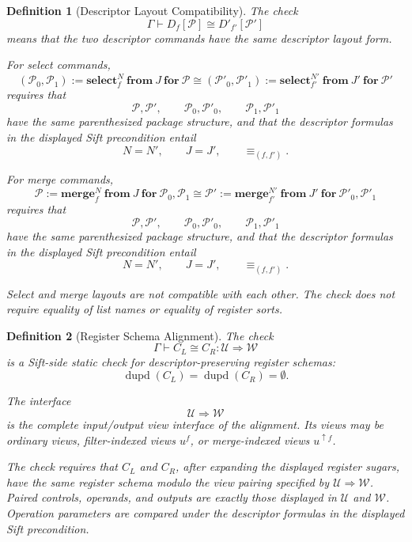 \documentclass[acmsmall,screen,review,anonymous,nonacm]{acmart}
\newtheorem{definition}{Definition}[section]
\theoremstyle{defn_style}
\begin{document}
\begin{definition}[Descriptor Layout Compatibility]
  The check
  \[
  \Gamma
  \vdash
  D_f[\mathcal P]
  \cong
  D'_{f'}[\mathcal P']
  \]
  means that the two descriptor commands have the same descriptor layout form.
  
  For select commands,
  \[
  (\mathcal P_0,\mathcal P_1)
  :=
  \mathbf{select}_{f}^{N}\ \mathbf{from}\ J\ \mathbf{for}\ \mathcal P
  \cong
  (\mathcal P'_0,\mathcal P'_1)
  :=
  \mathbf{select}_{f'}^{N'}\ \mathbf{from}\ J'\ \mathbf{for}\ \mathcal P'
  \]
  requires that
  \[
  \mathcal P,\mathcal P',
  \qquad
  \mathcal P_0,\mathcal P'_0,
  \qquad
  \mathcal P_1,\mathcal P'_1
  \]
  have the same parenthesized package structure, and that the descriptor formulas
  in the displayed Sift precondition entail
  \[
  N=N',
  \qquad
  J=J',
  \qquad
  \equiv_{(f,f')}.
  \]
  
  For merge commands,
  \[
  \mathcal P
  :=
  \mathbf{merge}_{f}^{N}\ \mathbf{from}\ J\ \mathbf{for}\ \mathcal P_0,\mathcal P_1
  \cong
  \mathcal P'
  :=
  \mathbf{merge}_{f'}^{N'}\ \mathbf{from}\ J'\ \mathbf{for}\ \mathcal P'_0,\mathcal P'_1
  \]
  requires that
  \[
  \mathcal P,\mathcal P',
  \qquad
  \mathcal P_0,\mathcal P'_0,
  \qquad
  \mathcal P_1,\mathcal P'_1
  \]
  have the same parenthesized package structure, and that the descriptor formulas
  in the displayed Sift precondition entail
  \[
  N=N',
  \qquad
  J=J',
  \qquad
  \equiv_{(f,f')}.
  \]
  
  Select and merge layouts are not compatible with each other.  The check does
  not require equality of list names or equality of register sorts.
  \end{definition}

  \begin{definition}[Register Schema Alignment]
    The check
    \[
    \Gamma
    \vdash
    C_L
    \cong
    C_R
    :
    \mathcal U
    \Rightarrow
    \mathcal W
    \]
    is a Sift-side static check for descriptor-preserving register schemas:
    \[
    \operatorname{dupd}(C_L)
    =
    \operatorname{dupd}(C_R)
    =
    \emptyset .
    \]
    
    The interface
    \[
    \mathcal U\Rightarrow\mathcal W
    \]
    is the complete input/output view interface of the alignment. Its views may be
    ordinary views, filter-indexed views \(u^{f}\), or merge-indexed views
    \(u^{\uparrow f}\).
    
    The check requires that \(C_L\) and \(C_R\), after expanding the displayed
    register sugars, have the same register schema modulo the view pairing specified
    by \(\mathcal U\Rightarrow\mathcal W\). Paired controls, operands, and outputs
    are exactly those displayed in \(\mathcal U\) and \(\mathcal W\). Operation
    parameters are compared under the descriptor formulas in the displayed Sift
    precondition.
    \end{definition}
\end{document}
